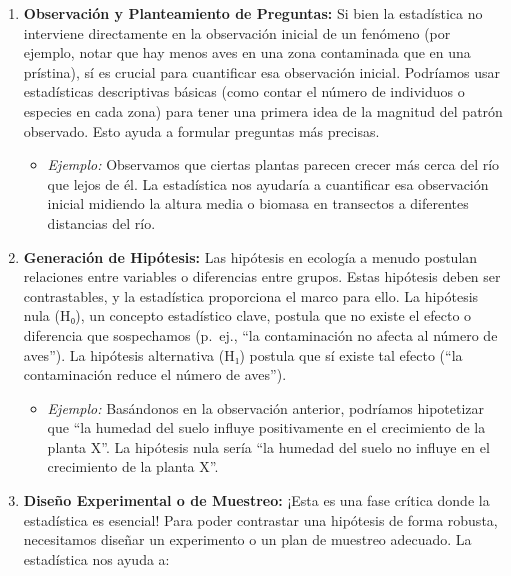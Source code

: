 \documentclass[
]{book}
\providecommand{\tightlist}{%
  \setlength{\itemsep}{0pt}\setlength{\parskip}{0pt}}
\begin{document}
\begin{enumerate}
\def\labelenumi{\arabic{enumi}.}
\tightlist
\item
  \textbf{Observación y Planteamiento de Preguntas:} Si bien la estadística no interviene directamente en la observación inicial de un fenómeno (por ejemplo, notar que hay menos aves en una zona contaminada que en una prístina), sí es crucial para cuantificar esa observación inicial. Podríamos usar estadísticas descriptivas básicas (como contar el número de individuos o especies en cada zona) para tener una primera idea de la magnitud del patrón observado. Esto ayuda a formular preguntas más precisas.

  \begin{itemize}
  \tightlist
  \item
    \emph{Ejemplo:} Observamos que ciertas plantas parecen crecer más cerca del río que lejos de él. La estadística nos ayudaría a cuantificar esa observación inicial midiendo la altura media o biomasa en transectos a diferentes distancias del río.
  \end{itemize}
\item
  \textbf{Generación de Hipótesis:} Las hipótesis en ecología a menudo postulan relaciones entre variables o diferencias entre grupos. Estas hipótesis deben ser contrastables, y la estadística proporciona el marco para ello. La hipótesis nula (H₀), un concepto estadístico clave, postula que no existe el efecto o diferencia que sospechamos (p.~ej., ``la contaminación no afecta al número de aves''). La hipótesis alternativa (H₁) postula que sí existe tal efecto (``la contaminación reduce el número de aves'').

  \begin{itemize}
  \tightlist
  \item
    \emph{Ejemplo:} Basándonos en la observación anterior, podríamos hipotetizar que ``la humedad del suelo influye positivamente en el crecimiento de la planta X''. La hipótesis nula sería ``la humedad del suelo no influye en el crecimiento de la planta X''.
  \end{itemize}
\item
  \textbf{Diseño Experimental o de Muestreo:} ¡Esta es una fase crítica donde la estadística es esencial! Para poder contrastar una hipótesis de forma robusta, necesitamos diseñar un experimento o un plan de muestreo adecuado. La estadística nos ayuda a:


\end{enumerate}
\end{document}
